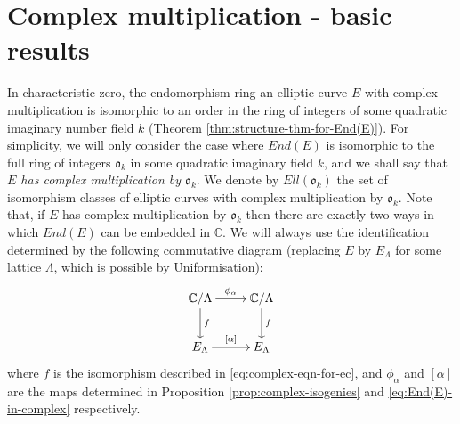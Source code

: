 \newpage
\section{Complex multiplication - basic results}
\label{sec:compl-mult-basic}

In characteristic zero, the endomorphism ring an elliptic curve $E$ with complex
multiplication is isomorphic to an order in the ring of integers of some quadratic imaginary number field
$k$ (Theorem \ref{thm:structure-thm-for-End(E)}).  For simplicity, we will only
consider the case where $End(E)$ is isomorphic to the full ring of integers
$\mathfrak{o}_{k}$ in some quadratic imaginary field $k$, and we shall say that \emph{$E$
has complex multiplication by $\mathfrak{o}_{k}$}.  We denote by
$Ell(\mathfrak{o}_{k})$ the set of isomorphism classes of elliptic curves with
complex multiplication by $\mathfrak{o}_{k}$.  Note that, if $E$ has complex
multiplication by $\mathfrak{o}_{k}$ then there are exactly two ways in which
$End(E)$ can be embedded in $\mathbb{C}$.  We will always use the identification
determined by the following commutative diagram (replacing $E$ by $E_{\Lambda}$ for
some lattice $\Lambda$, which is possible by Uniformisation):
\begin{equation}
  \label{eq:o-identified-with-End(E)}
  \begin{split}
  \xymatrix{
    \mathbb{C} / \Lambda \ar[d]^{f} \ar[r]^{\phi_{\alpha}} & \mathbb{C} / \Lambda \ar[d]^{f}\\
    E_{\Lambda} \ar[r]^{[\alpha]}& E_{\Lambda}
  }
  \end{split}
\end{equation}
where $f$ is the isomorphism described in \eqref{eq:complex-eqn-for-ec}, and
$\phi_{\alpha}$ and $[\alpha]$ are the maps determined in Proposition
\ref{prop:complex-isogenies} and \eqref{eq:End(E)-in-complex} respectively.

